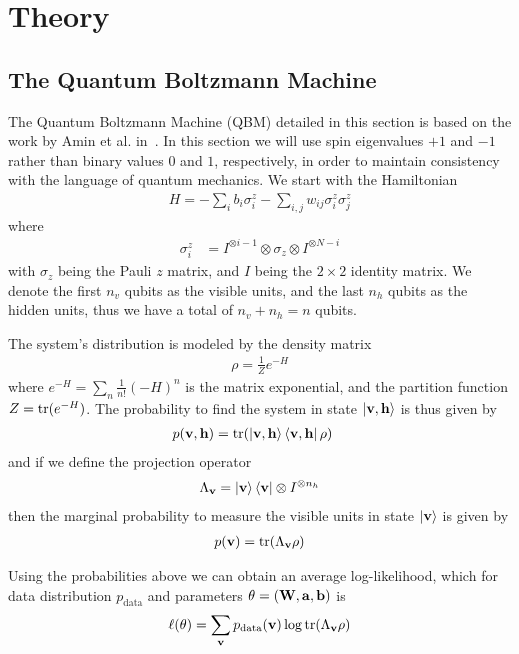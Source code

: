 \section{Theory}
\subsection{The Quantum Boltzmann Machine}
The Quantum Boltzmann Machine (QBM) detailed in this section is based on the work by Amin et al. in~\cite{amin_2018}.
In this section we will use spin eigenvalues \( +1 \) and \( -1 \) rather than binary values \( 0 \) and \( 1 \), respectively, in order to maintain consistency with the language of quantum mechanics.
We start with the Hamiltonian
\begin{align}
    H = -\sum_i b_i \sigma_i^z - \sum_{i,j} w_{ij} \sigma_i^z \sigma_j^z
\end{align}
where
\begin{align}
    \sigma_i^z
        &= I^{\otimes i-1} \otimes \sigma_z \otimes I^{\otimes N-i}
\end{align}
with \( \sigma_z \) being the Pauli \( z \) matrix, and \( I \) being the \( 2 \times 2 \) identity matrix.
We denote the first \( n_v \) qubits as the visible units, and the last \( n_h \) qubits as the hidden units, thus we have a total of \( n_v + n_h = n \) qubits.

The system's distribution is modeled by the density matrix
\begin{align}
    \rho = \frac{1}{Z} e^{-H}
\end{align}
where \( e^{-H} = \sum_n \frac{1}{n!} (-H)^n \) is the matrix exponential, and the partition function \( Z = \text{tr}(e^{-H}) \).
The probability to find the system in state \( \ket{\mathbf{v},\mathbf{h}} \) is thus given by
\begin{align}
    p(\mathbf{v},\mathbf{h})
        &= \text{tr}(\ket{\mathbf{v},\mathbf{h}}\bra{\mathbf{v},\mathbf{h}} \rho)
\end{align}
and if we define the projection operator
\begin{align}
    \Lambda_{\mathbf{v}} = \ket{\mathbf{v}}\bra{\mathbf{v}} \otimes I^{\otimes n_h}
\end{align}
then the marginal probability to measure the visible units in state \( \ket{\mathbf{v}} \) is given by
\begin{align}
    p(\mathbf{v}) = \text{tr}(\Lambda_{\mathbf{v}}\rho)
\end{align}

Using the probabilities above we can obtain an average log-likelihood, which for data distribution \( p_\text{data} \) and parameters \( \theta = (\mathbf{W}, \mathbf{a}, \mathbf{b}) \) is
\begin{align}
    \ell(\theta) = \sum_{\mathbf{v}} p_{\text{data}}(\mathbf{v}) \log \text{tr}(\Lambda_{\mathbf{v}}\rho)
\end{align}

